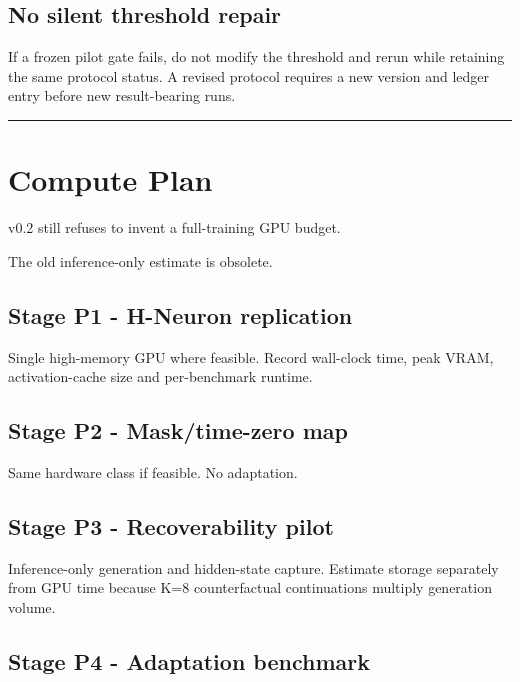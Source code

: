 \subsection{No silent threshold repair}\label{no-silent-threshold-repair}

If a frozen pilot gate fails, do not modify the threshold and rerun while retaining the same protocol status. A revised protocol requires a new version and ledger entry before new result-bearing runs.

\begin{center}\rule{0.5\linewidth}{0.5pt}\end{center}

\section{Compute Plan}\label{compute-plan}

v0.2 still refuses to invent a full-training GPU budget.

The old inference-only estimate is obsolete.

\subsection{Stage P1 - H-Neuron replication}\label{stage-p1---h-neuron-replication}

Single high-memory GPU where feasible. Record wall-clock time, peak VRAM, activation-cache size and per-benchmark runtime.

\subsection{Stage P2 - Mask/time-zero map}\label{stage-p2---masktime-zero-map}

Same hardware class if feasible. No adaptation.

\subsection{Stage P3 - Recoverability pilot}\label{stage-p3---recoverability-pilot}

Inference-only generation and hidden-state capture. Estimate storage separately from GPU time because K=8 counterfactual continuations multiply generation volume.

\subsection{Stage P4 - Adaptation benchmark}\label{stage-p4---adaptation-benchmark}

